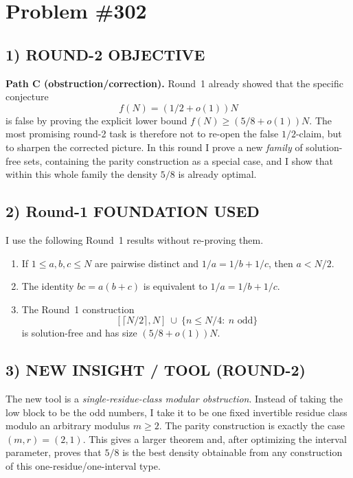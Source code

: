 \section*{Problem \#302}

\subsection*{1) ROUND-2 OBJECTIVE}
\textbf{Path C (obstruction/correction).}
Round~1 already showed that the specific conjecture
\[
  f(N)=(1/2+o(1))N
\]
is false by proving the explicit lower bound \(f(N)\ge (5/8+o(1))N\).
The most promising round-2 task is therefore not to re-open the false \(1/2\)-claim, but to sharpen the corrected picture.
In this round I prove a new \emph{family} of solution-free sets, containing the parity construction as a special case, and I show that within this whole family the density \(5/8\) is already optimal.

\subsection*{2) Round-1 FOUNDATION USED}
I use the following Round~1 results without re-proving them.
\begin{enumerate}
\item If \(1\le a,b,c\le N\) are pairwise distinct and \(1/a=1/b+1/c\), then \(a<N/2\).
\item The identity \(bc=a(b+c)\) is equivalent to \(1/a=1/b+1/c\).
\item The Round~1 construction
\[
  [\lceil N/2\rceil,N]\ \cup\ \{n\le N/4:\ n\text{ odd}\}
\]
is solution-free and has size \((5/8+o(1))N\).
\end{enumerate}

\subsection*{3) NEW INSIGHT / TOOL (ROUND-2)}
The new tool is a \emph{single-residue-class modular obstruction}.
Instead of taking the low block to be the odd numbers, I take it to be one fixed invertible residue class modulo an arbitrary modulus \(m\ge 2\).
The parity construction is exactly the case \((m,r)=(2,1)\).
This gives a larger theorem and, after optimizing the interval parameter, proves that \(5/8\) is the best density obtainable from any construction of this one-residue/one-interval type.


